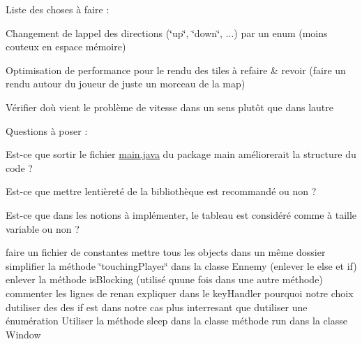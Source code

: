 Liste des choses à faire \+:
\begin{DoxyItemize}
\item Changement de l\textquotesingle{}appel des directions (\char`\"{}up\char`\"{}, \char`\"{}down\char`\"{}, ...) par un enum (moins couteux en espace mémoire)
\item Optimisation de performance pour le rendu des tiles à refaire \& revoir (faire un rendu autour du joueur de juste un morceau de la map)
\item Vérifier d\textquotesingle{}où vient le problème de vitesse dans un sens plutôt que dans l\textquotesingle{}autre
\end{DoxyItemize}

Questions à poser \+:
\begin{DoxyItemize}
\item Est-\/ce que sortir le fichier \mbox{\hyperlink{_main_8java}{main.\+java}} du package main améliorerait la structure du code ?
\item Est-\/ce que mettre l\textquotesingle{}entièreté de la bibliothèque est recommandé ou non ?
\item Est-\/ce que dans les notions à implémenter, le tableau est considéré comme à taille variable ou non ?
\item faire un fichier de constantes mettre tous les objects dans un même dossier simplifier la méthode \char`\"{}touching\+Player\char`\"{} dans la classe Ennemy (enlever le else et if) enlever la méthode is\+Blocking (utilisé qu\textquotesingle{}une fois dans une autre méthode) commenter les lignes de renan expliquer dans le key\+Handler pourquoi notre choix d\textquotesingle{}utiliser des des if est dans notre cas plus interresant que d\textquotesingle{}utiliser une énumération Utiliser la méthode sleep dans la classe méthode run dans la classe Window 
\end{DoxyItemize}